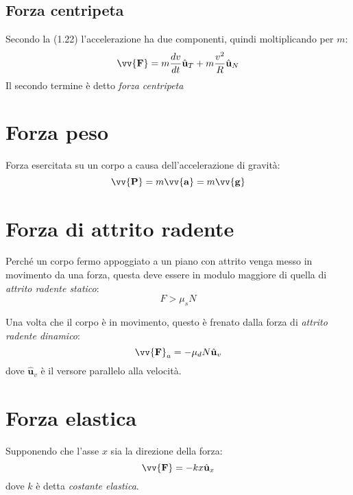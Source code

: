 \documentclass{report}
\newcommand{\versore}[1]{\hat{\mathbf{u}}_{#1}}
\newcommand{\ux}{\versore{x}}
\newcommand{\uT}{\versore{T}}
\newcommand{\uN}{\versore{N}}
\newcommand{\uv}{\versore{v}}
\newcommand{\vett}[1]{\vv{\boldsymbol{\mathbf{#1}}}}
\begin{document}
\subsection{Forza centripeta}
Secondo la (1.22) l'accelerazione ha due componenti, quindi moltiplicando
per \(m\):
\begin{equation*}
    \vett{F} = m\frac{dv}{dt}\uT + m\frac{v^2}{R}\uN
\end{equation*}
Il secondo termine è detto \emph{forza centripeta}

\section{Forza peso}
Forza esercitata su un corpo a causa dell'accelerazione di gravità:
\begin{equation*}
    \vett{P} = m\vett{a} = m\vett{g}
\end{equation*}

\section{Forza di attrito radente}
Perché un corpo fermo appoggiato a un piano con attrito venga messo in movimento da una forza, 
questa deve essere in modulo maggiore di quella di \emph{attrito radente statico}:
\begin{equation*}
    F > \mu_s N
\end{equation*}


Una volta che il corpo è in movimento, questo è frenato dalla forza di \emph{attrito radente dinamico}:
\begin{equation}
    \vett{F}_a = -\mu_d N\uv
\end{equation}
dove \(\uv\) è il versore parallelo alla velocità.

\section{Forza elastica}
Supponendo che l'asse \(x\) sia la direzione della forza:
\begin{equation*}
    \vett{F} = -kx\ux
\end{equation*}
dove \(k\) è detta \emph{costante elastica}.
\end{document}
